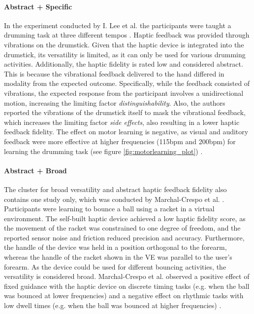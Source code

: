 \paragraph{Abstract + Specific} \label{sec:abstractspecific}
In the experiment conducted by I. Lee et al. the participants were taught a drumming task at three different tempos \cite{Lee2012}. Haptic feedback was provided through vibrations on the drumstick. Given that the haptic device is integrated into the drumstick, its versatility is limited, as it can only be used for various drumming activities. Additionally, the haptic fidelity is rated low and considered abstract. This is because the vibrational feedback delivered to the hand differed in modality from the expected outcome. Specifically, while the feedback consisted of vibrations, the expected response from the participant involves a unidirectional motion, increasing the limiting factor \textit{distinguishability}. Also, the authors reported the vibrations of the drumstick itself to mask the vibrational feedback, which increases the limiting factor \textit{side effects}, also resulting in a lower haptic feedback fidelity. The effect on motor learning is negative, as visual and auditory feedback were more effective at higher frequencies (115bpm and 200bpm) for learning the drumming task (see figure \ref{fig:motorlearning_plot}) \cite{Lee2012}.

\paragraph{Abstract + Broad} \label{sec:abstractbroad}
The cluster for broad versatility and abstract haptic feedback fidelity also contains one study only, which was conducted by Marchal-Crespo et al. \cite{Marchal-Crespo2009ReviewInjury}. Participants were learning to bounce a ball using a racket in a virtual environment. The self-built haptic device achieved a low haptic fidelity score, as the movement of the racket was constrained to one degree of freedom, and the reported sensor noise and friction reduced precision and accuracy. Furthermore, the handle of the device was held in a position orthogonal to the forearm, whereas the handle of the racket shown in the VE was parallel to the user's forearm. As the device could be used for different bouncing activities, the versatility is considered broad. Marchal-Crespo et al. observed a positive effect of fixed guidance with the haptic device on discrete timing tasks (e.g. when the ball was bounced at lower frequencies) and a negative effect on rhythmic tasks with low dwell times (e.g. when the ball was bounced at higher frequencies) \cite{Crespo2015}.

